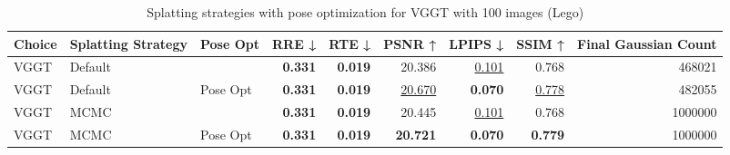 \begin{table}[H]
\caption{Splatting strategies with pose optimization for VGGT with 100 images (Lego)}
\label{tab:09_splatting_strategy_pose_opt_lego}
\begin{tabular}{lllrrrrrr}
\toprule
Choice & Splatting Strategy & Pose Opt & RRE ↓ & RTE ↓ & PSNR ↑ & LPIPS ↓ & SSIM ↑ & Final Gaussian Count \\
\midrule
VGGT & Default &  & \textbf{0.331} & \textbf{0.019} & 20.386 & \underline{0.101} & 0.768 & 468021 \\
VGGT & Default & Pose Opt & \textbf{0.331} & \textbf{0.019} & \underline{20.670} & \textbf{0.070} & \underline{0.778} & 482055 \\
VGGT & MCMC &  & \textbf{0.331} & \textbf{0.019} & 20.445 & \underline{0.101} & 0.768 & 1000000 \\
VGGT & MCMC & Pose Opt & \textbf{0.331} & \textbf{0.019} & \textbf{20.721} & \textbf{0.070} & \textbf{0.779} & 1000000 \\
\bottomrule
\end{tabular}
\end{table}
